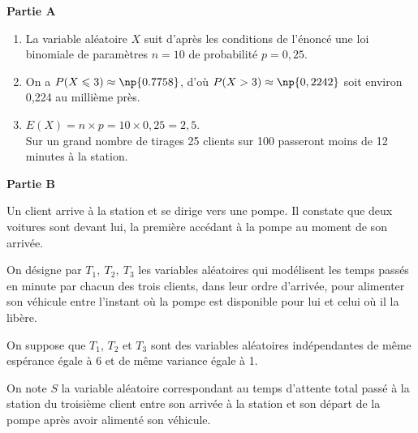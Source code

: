 \medskip

\begin{center}\textbf{Partie A } \end{center}





\medskip

\begin{enumerate}
\item 
La variable aléatoire $X$ suit d'après les conditions de l'énoncé une loi binomiale de paramètres $n = 10$ de probabilité $p = 0,25$.

\item 
On a $P(X \leqslant 3) \approx \np{0.7758}$, d'où $P(X > 3) \approx \np{0,2242}$ soit environ 0,224 au millième près.

\item 
$E(X) = n \times p = 10 \times 0,25 = 2,5$.\\
Sur un grand nombre de tirages  25 clients sur 100 passeront moins de 12 minutes à la station.
\end{enumerate}

\begin{center}\textbf{Partie B } \end{center}

Un client arrive à la station et se dirige vers une pompe. Il constate que deux voitures sont
devant lui, la première accédant à la pompe au moment de son arrivée.

On désigne par $T_1,\: T_2,\: T_3$ les variables aléatoires qui modélisent les temps passés en minute par chacun des trois clients, dans leur ordre d'arrivée, pour alimenter son véhicule entre l'instant où la pompe est disponible pour lui et celui où il la libère.

On suppose que $T_1$, $T_2$ et $T_3$ sont des variables aléatoires indépendantes de même espérance égale à $6$ et de même variance égale à 1.

On note $S$ la variable aléatoire correspondant au temps d'attente total passé à la station du troisième client entre son arrivée à la station et son départ de la pompe après avoir alimenté son véhicule.

\medskip

